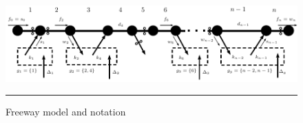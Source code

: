 \begin{figure}[t]
	\centering
	\includegraphics[width=7in]{figures/scheme.pdf}
%
	\rule{7in}{0.3pt}
	\caption{Freeway model and notation}
	\label{fig:scheme}
\end{figure}
